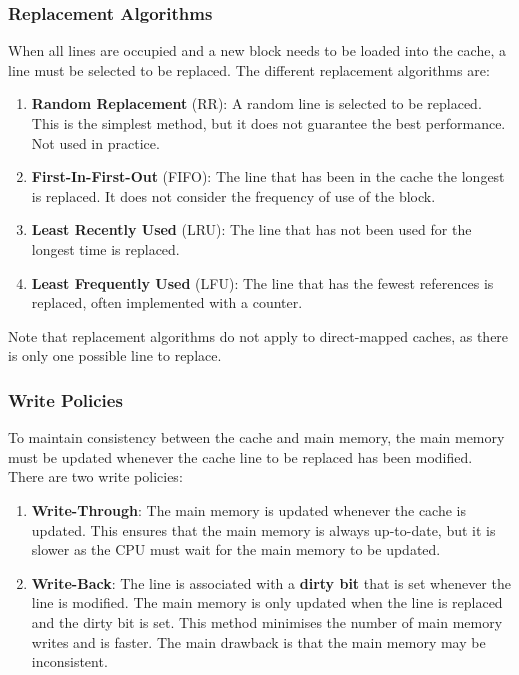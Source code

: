 \subsubsection{Replacement Algorithms}

When all lines are occupied and a new block needs to be loaded into the cache, a line
must be selected to be replaced. The different replacement algorithms are:
\begin{enumerate}
\item \textbf{Random Replacement} (RR): 
    A random line is selected to be replaced. This is the simplest method, but it
    does not guarantee the best performance. Not used in practice.

\item \textbf{First-In-First-Out} (FIFO):
    The line that has been in the cache the longest is replaced. It does not consider
    the frequency of use of the block.

\item \textbf{Least Recently Used} (LRU):
    The line that has not been used for the longest time is replaced.

\item \textbf{Least Frequently Used} (LFU):
    The line that has the fewest references is replaced, often implemented with a counter.
\end{enumerate}

Note that replacement algorithms do not apply to direct-mapped caches, as there is only
one possible line to replace.

\subsubsection{Write Policies}

To maintain consistency between the cache and main memory, the main memory must be updated
whenever the cache line to be replaced has been modified. There are two write policies:
\begin{enumerate}
\item \textbf{Write-Through}:
    The main memory is updated whenever the cache is updated. This ensures that the main
    memory is always up-to-date, but it is slower as the CPU must wait for the main memory
    to be updated.

\item \textbf{Write-Back}:
    The line is associated with a \textbf{dirty bit} that is set whenever the line is
    modified. The main memory is only updated when the line is replaced and the dirty bit
    is set. This method minimises the number of main memory writes and is faster.
    The main drawback is that the main memory may be inconsistent.
\end{enumerate}

